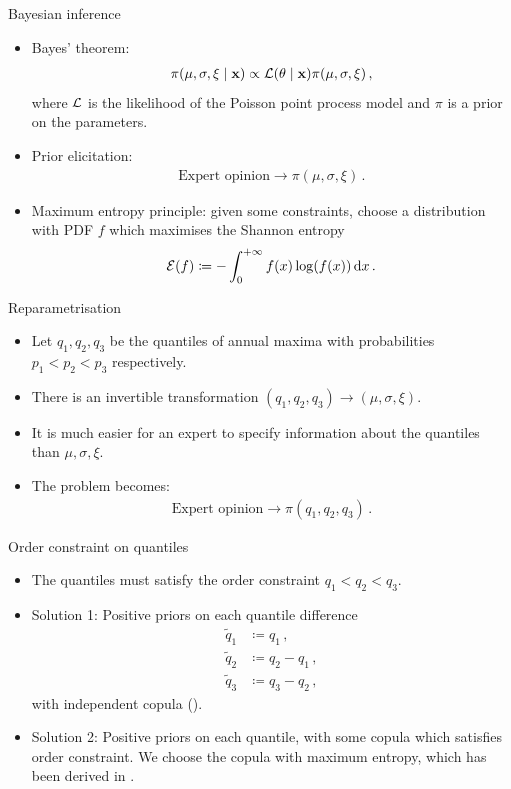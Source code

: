 \documentclass[10pt]{beamer}
\newcommand{\dd}{{\rm d}}
\begin{document}
\begin{frame}{Bayesian inference}{}
%
\begin{itemize}
	\item Bayes' theorem:
		\begin{align*}
			\pi(\mu, \sigma, \xi \mid \mathbf{x}) \propto {\cal L}(\theta \mid \mathbf{x}) \pi(\mu, \sigma, \xi) \,,
		\end{align*}
		where ${\cal L}$ is the likelihood of the Poisson point process model
		and $\pi$ is a prior on the parameters.
	\item Prior elicitation:
		\begin{align*}
			\text{Expert opinion} \longrightarrow \pi(\mu, \sigma, \xi) \,.
		\end{align*}
	\item Maximum entropy principle: given some constraints,
		choose a distribution with PDF $f$ which maximises the Shannon entropy
		\begin{align*}
			{\cal E}(f) \coloneqq -\int_0^{+\infty} f(x) \log(f(x)) \, \dd x \,.
		\end{align*}
\end{itemize}
%
\end{frame}
%
%
\begin{frame}{Reparametrisation}{}
%
\begin{itemize}
	\item Let $q_1, q_2, q_3$ be the quantiles of annual maxima
		with probabilities $p_1 < p_2 < p_3$ respectively.
	\item There is an invertible transformation
		$(q_1, q_2, q_3) \to (\mu, \sigma, \xi)$.
	\item It is much easier for an expert to specify information about
	the quantiles than $\mu, \sigma, \xi$.
	\item The problem becomes:
		\begin{align*}
			\text{Expert opinion} \longrightarrow \pi(q_1, q_2, q_3) \,.
		\end{align*}
\end{itemize}
%
\end{frame}
%
%
\begin{frame}{Order constraint on quantiles}{}
%
\begin{itemize}
	\item The quantiles must satisfy the order constraint
		$q_1 < q_2 < q_3$.
	\item Solution 1: Positive priors on each quantile difference
		\begin{align*}
			\tilde{q}_1 &\coloneqq q_1 \,,\\
			\tilde{q}_2 &\coloneqq q_2 - q_1 \,,\\
			\tilde{q}_3 &\coloneqq q_3 - q_2 \,,
		\end{align*}
		with independent copula (\cite{coles1996}).
	\item Solution 2: Positive priors on each quantile, with some copula
		which satisfies order constraint.
		We choose the copula with maximum entropy,
		which has been derived in \cite{butucea2018}.
\end{itemize}
%
\end{frame}
\end{document}
